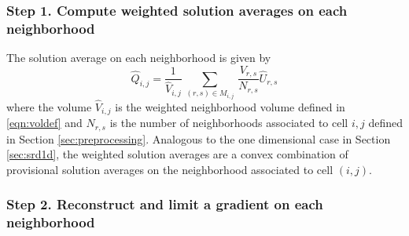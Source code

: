 \subsubsection*{Step 1. Compute weighted solution averages on each neighborhood}   

The solution average on each neighborhood is given by
\begin{equation}
\label{tiledef}
\widehat{Q}_{i,j} =  \frac{1}{{\widehat V}_{i,j}} \, \sum_{(r,s) \in M_{i,j}} \,  
\frac{V_{r,s}}{N_{r,s}}  \widehat{U}_{r,s}
\end{equation}
where the volume ${\widehat V}_{i,j}$ is the weighted neighborhood volume defined in \eqref{eqn:voldef}
and $N_{r,s}$ is the number of neighborhoods  associated to cell $i,j$ defined in 
Section \ref{sec:preprocessing}.  
Analogous to the one dimensional case in Section \ref{sec:srd1d}, the weighted solution 
averages are a convex combination of provisional solution averages on the neighborhood associated to cell $(i,j)$.  

\subsubsection*{Step 2. Reconstruct and limit a gradient on each neighborhood}

